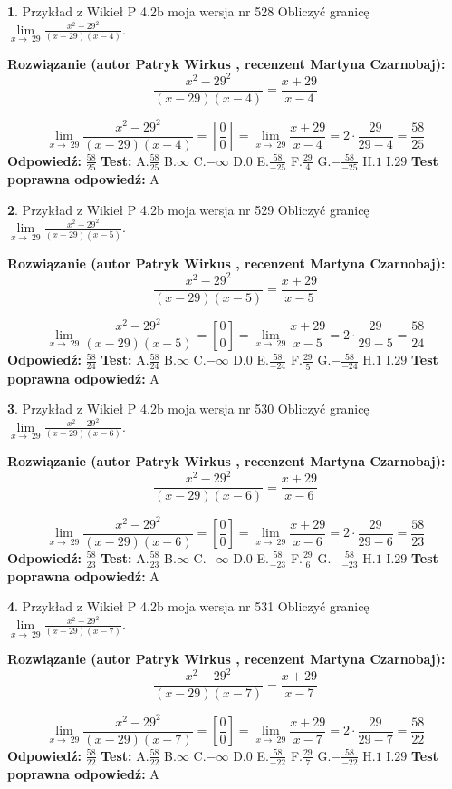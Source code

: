 \documentclass[12pt, a4paper]{article}
\theoremstyle{definition} %
\newtheorem{zad}{}
\newcommand{\zadStart}[1]{\begin{zad}#1\newline}
\newcommand{\zadStop}{\end{zad}}
\newcommand{\rozwStart}[2]{\noindent \textbf{Rozwiązanie (autor #1 , recenzent #2): }\newline}
\newcommand{\rozwStop}{\newline}
\newcommand{\odpStart}{\noindent \textbf{Odpowiedź:}\newline}
\newcommand{\odpStop}{\newline}
\newcommand{\testStart}{\noindent \textbf{Test:}\newline}
\newcommand{\testStop}{\newline}
\newcommand{\kluczStart}{\noindent \textbf{Test poprawna odpowiedź:}\newline}
\newcommand{\kluczStop}{\newline}
\begin{document}
\zadStart{Przykład z Wikieł P 4.2b moja wersja nr 528}
Obliczyć granicę $\lim\limits_{x\to\ 29}\frac{x^{2}-29^{2}}{(x-29)(x-4)}$.
\zadStop
\rozwStart{Patryk Wirkus}{Martyna Czarnobaj}
$$\frac{x^{2}-29^{2}}{(x-29)(x-4)}=\frac{x+29}{x-4}$$

$$\lim\limits_{x\to\ 29}\frac{x^{2}-29^{2}}{(x-29)(x-4)}=[\frac{0}{0}]=\lim\limits_{x\to\ 29}\frac{x+29}{x-4}=2 \cdot \frac{29}{29-4} = \frac{58}{25}$$
\rozwStop
\odpStart
$\frac{58}{25}$
\odpStop
\testStart
A.$\frac{58}{25}$
B.$\infty$
C.$-\infty$
D.$0$
E.$\frac{58}{-25}$
F.$\frac{29}{4}$
G.$-\frac{58}{-25}$
H.$1$
I.$29$
\testStop
\kluczStart
A
\kluczStop



\zadStart{Przykład z Wikieł P 4.2b moja wersja nr 529}
Obliczyć granicę $\lim\limits_{x\to\ 29}\frac{x^{2}-29^{2}}{(x-29)(x-5)}$.
\zadStop
\rozwStart{Patryk Wirkus}{Martyna Czarnobaj}
$$\frac{x^{2}-29^{2}}{(x-29)(x-5)}=\frac{x+29}{x-5}$$

$$\lim\limits_{x\to\ 29}\frac{x^{2}-29^{2}}{(x-29)(x-5)}=[\frac{0}{0}]=\lim\limits_{x\to\ 29}\frac{x+29}{x-5}=2 \cdot \frac{29}{29-5} = \frac{58}{24}$$
\rozwStop
\odpStart
$\frac{58}{24}$
\odpStop
\testStart
A.$\frac{58}{24}$
B.$\infty$
C.$-\infty$
D.$0$
E.$\frac{58}{-24}$
F.$\frac{29}{5}$
G.$-\frac{58}{-24}$
H.$1$
I.$29$
\testStop
\kluczStart
A
\kluczStop



\zadStart{Przykład z Wikieł P 4.2b moja wersja nr 530}
Obliczyć granicę $\lim\limits_{x\to\ 29}\frac{x^{2}-29^{2}}{(x-29)(x-6)}$.
\zadStop
\rozwStart{Patryk Wirkus}{Martyna Czarnobaj}
$$\frac{x^{2}-29^{2}}{(x-29)(x-6)}=\frac{x+29}{x-6}$$

$$\lim\limits_{x\to\ 29}\frac{x^{2}-29^{2}}{(x-29)(x-6)}=[\frac{0}{0}]=\lim\limits_{x\to\ 29}\frac{x+29}{x-6}=2 \cdot \frac{29}{29-6} = \frac{58}{23}$$
\rozwStop
\odpStart
$\frac{58}{23}$
\odpStop
\testStart
A.$\frac{58}{23}$
B.$\infty$
C.$-\infty$
D.$0$
E.$\frac{58}{-23}$
F.$\frac{29}{6}$
G.$-\frac{58}{-23}$
H.$1$
I.$29$
\testStop
\kluczStart
A
\kluczStop



\zadStart{Przykład z Wikieł P 4.2b moja wersja nr 531}
Obliczyć granicę $\lim\limits_{x\to\ 29}\frac{x^{2}-29^{2}}{(x-29)(x-7)}$.
\zadStop
\rozwStart{Patryk Wirkus}{Martyna Czarnobaj}
$$\frac{x^{2}-29^{2}}{(x-29)(x-7)}=\frac{x+29}{x-7}$$

$$\lim\limits_{x\to\ 29}\frac{x^{2}-29^{2}}{(x-29)(x-7)}=[\frac{0}{0}]=\lim\limits_{x\to\ 29}\frac{x+29}{x-7}=2 \cdot \frac{29}{29-7} = \frac{58}{22}$$
\rozwStop
\odpStart
$\frac{58}{22}$
\odpStop
\testStart
A.$\frac{58}{22}$
B.$\infty$
C.$-\infty$
D.$0$
E.$\frac{58}{-22}$
F.$\frac{29}{7}$
G.$-\frac{58}{-22}$
H.$1$
I.$29$
\testStop
\kluczStart
A
\kluczStop
\end{document}
